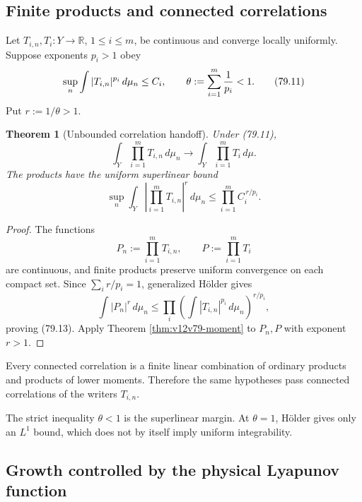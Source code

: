 \documentclass[11pt]{article}
\newtheorem{theorem}{Theorem}[section]
\theoremstyle{remark}
\begin{document}
\subsection{Finite products and connected correlations}

Let \(T_{i,n},T_i:Y\to\mathbb R\), \(1\leq i\leq m\), be continuous
and converge locally uniformly.  Suppose exponents \(p_i>1\) obey
\begin{equation}
 \sup_n\int|T_{i,n}|^{p_i}\,d\mu_n\leq C_i,\qquad
                         \theta:=\sum_{i=1}^m{1\over p_i}<1. \tag{79.11}
\end{equation}
Put \(r:=1/\theta>1\).

\begin{theorem}[Unbounded correlation handoff]
\label{thm:v12v79-products}
Under (79.11),
\begin{equation}
 \int_Y\prod_{i=1}^mT_{i,n}\,d\mu_n
 \longrightarrow
 \int_Y\prod_{i=1}^mT_i\,d\mu.                              \tag{79.12}
\end{equation}
The products have the uniform superlinear bound
\begin{equation}
 \sup_n\int_Y
 \left|\prod_{i=1}^mT_{i,n}\right|^r\,d\mu_n
 \leq\prod_{i=1}^m C_i^{\,r/p_i}.                           \tag{79.13}
\end{equation}
\end{theorem}

\begin{proof}
The functions
\[
                         P_n:=\prod_{i=1}^mT_{i,n},
 \qquad P:=\prod_{i=1}^mT_i
\]
are continuous, and finite products preserve uniform convergence on
each compact set.  Since
\(\sum_i r/p_i=1\), generalized Hölder gives
\[
 \int|P_n|^r\,d\mu_n
 \leq\prod_i
 \left(\int|T_{i,n}|^{p_i}\,d\mu_n\right)^{r/p_i},
\]
proving (79.13).  Apply Theorem
\ref{thm:v12v79-moment} to \(P_n,P\) with exponent \(r>1\).
\end{proof}

Every connected correlation is a finite linear combination of
ordinary products and products of lower moments.  Therefore the same
hypotheses pass connected correlations of the writers
\(T_{i,n}\).

The strict inequality \(\theta<1\) is the superlinear margin.  At
\(\theta=1\), Hölder gives only an \(L^1\) bound, which does not by
itself imply uniform integrability.

\subsection{Growth controlled by the physical Lyapunov function}
\end{document}
